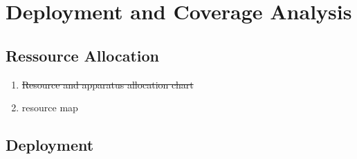 \chapter{Deployment and Coverage Analysis}
\label{chap:deployment_analysis}

\section{Ressource Allocation}

\begin{enumerate}
    \item \sout{Resource and apparatus allocation chart}
    \item resource map
\end{enumerate}

\section{Deployment}



\setlength{\LTleft}{0pt}
\setlength{\LTright}{0pt}

